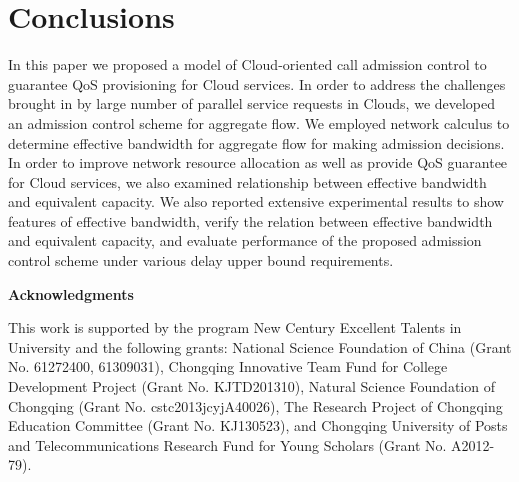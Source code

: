 \documentclass[a4paper]{article}
\begin{document}
\section{Conclusions}

In this paper we proposed a model of Cloud-oriented call admission control to guarantee QoS provisioning for Cloud services. In order to address the challenges brought in by large number of parallel service requests in Clouds, we developed an admission control scheme for aggregate flow. We employed network calculus to determine effective bandwidth for aggregate flow for making admission decisions. In order to improve network resource allocation as well as provide QoS guarantee for Cloud services, we also examined relationship between effective bandwidth and equivalent capacity. We also reported extensive experimental results to show features of effective bandwidth, verify the relation between effective bandwidth and equivalent capacity, and evaluate performance of the proposed admission control scheme under various delay upper bound requirements.

\begin{flushleft}
  \Large
  \textbf{Acknowledgments}
\end{flushleft}

This work is supported by the program New Century Excellent Talents in University and the following grants: National Science Foundation of China (Grant No. 61272400, 61309031), Chongqing Innovative Team Fund for College Development Project (Grant No. KJTD201310), Natural Science Foundation of Chongqing (Grant No. cstc2013jcyjA40026), The Research Project of Chongqing Education Committee (Grant No. KJ130523), and Chongqing University of Posts and Telecommunications Research Fund for Young Scholars (Grant No. A2012-79).



\end{document}
